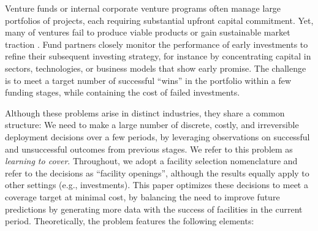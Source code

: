 \documentclass[blindrev]{informs3noheader}
\begin{document}
\begin{example}
Venture funds or internal corporate venture programs often manage large portfolios of projects, each requiring substantial upfront capital commitment. Yet, many of ventures fail to produce viable products or gain sustainable market traction \citep{challapally2025genai}. Fund partners closely monitor the performance of early investments to refine their subsequent investing strategy, for instance by concentrating capital in sectors, technologies, or business models that show early promise. The challenge is to meet a target number of successful ``wins'' in the portfolio within a few funding stages, while containing the cost of failed investments.
\end{example}
Although these problems arise in distinct industries, they share a common structure: We need to make a large number of discrete, costly, and irreversible deployment decisions over a few periods, by leveraging observations on successful and unsuccessful outcomes from previous stages. We refer to this problem as \emph{learning to cover}. Throughout, we adopt a facility selection nomenclature and refer to the decisions as ``facility openings'', although the results equally apply to other settings (e.g., investments). This paper optimizes these decisions to meet a coverage target at minimal cost, by balancing the need to improve future predictions by generating more data with the success of facilities in the current period. Theoretically, the problem features the following elements:
\end{document}
